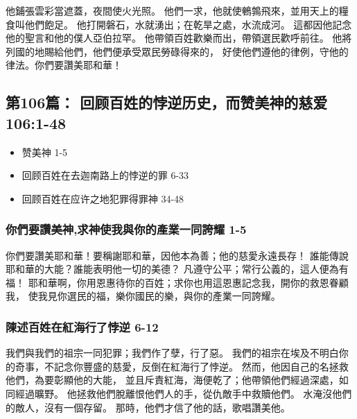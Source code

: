 他鋪張雲彩當遮蓋，夜間使火光照。
他們一求，他就使鵪鶉飛來，並用天上的糧食叫他們飽足。
他打開磐石，水就湧出；在乾旱之處，水流成河。
這都因他記念他的聖言和他的僕人亞伯拉罕。
他帶領百姓歡樂而出，帶領選民歡呼前往。
他將列國的地賜給他們，他們便承受眾民勞碌得來的，
好使他們遵他的律例，守他的律法。你們要讚美耶和華！


\subsection{第106篇： 回顾百姓的悖逆历史，而赞美神的慈爱 106:1-48}
\begin{itemize}
\itemsep-.45em
\item 赞美神 1-5
\item 回顾百姓在去迦南路上的悖逆的罪 6-33
\item 回顾百姓在应许之地犯罪得罪神 34-48
\end{itemize}

\subsubsection{你們要讚美神,求神使我與你的產業一同誇耀 1-5}
你們要讚美耶和華！要稱謝耶和華，因他本為善；他的慈愛永遠長存！
誰能傳說耶和華的大能？誰能表明他一切的美德？
凡遵守公平；常行公義的，這人便為有福！
耶和華啊，你用恩惠待你的百姓；求你也用這恩惠記念我，開你的救恩眷顧我，
使我見你選民的福，樂你國民的樂，與你的產業一同誇耀。

\subsubsection{陳述百姓在紅海行了悖逆 6-12}
我們與我們的祖宗一同犯罪；我們作了孽，行了惡。
我們的祖宗在埃及不明白你的奇事，不記念你豐盛的慈愛，反倒在紅海行了悖逆。
然而，他因自己的名拯救他們，為要彰顯他的大能，
並且斥責紅海，海便乾了；他帶領他們經過深處，如同經過曠野。
他拯救他們脫離恨他們人的手，從仇敵手中救贖他們。
水淹沒他們的敵人，沒有一個存留。
那時，他們才信了他的話，歌唱讚美他。

